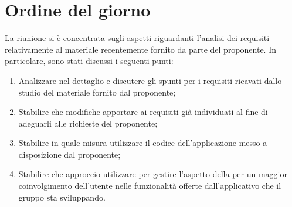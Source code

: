 \documentclass[a4paper, 12pt]{article}
\begin{document}
	
\newpage
\section{Ordine del giorno}
La riunione si è concentrata sugli aspetti riguardanti l'analisi dei requisiti relativamente al materiale recentemente fornito da parte del proponente. In particolare, sono stati discussi i seguenti punti:
\begin{enumerate}
    \item Analizzare nel dettaglio e discutere gli spunti per i requisiti ricavati dallo studio del materiale fornito dal proponente;
	\item Stabilire che modifiche apportare ai requisiti già individuati al fine di adeguarli alle richieste del proponente;
	\item Stabilire in quale misura utilizzare il codice dell'applicazione   messo a disposizione dal proponente;
	\item Stabilire che approccio utilizzare per gestire l'aspetto della  per un maggior coinvolgimento dell'utente nelle funzionalità offerte dall'applicativo che il gruppo sta sviluppando.
\end{enumerate}

\newpage
\end{document}
